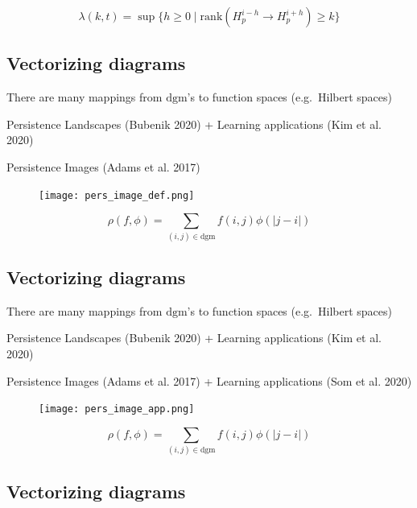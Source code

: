 \documentclass[
  letterpaper,
  DIV=11,
  numbers=noendperiod,
  oneside]{scrartcl}
\begin{document}
\[ \lambda(k, t) = \sup \{ h \geq 0 \mid \mathrm{rank}(H_p^{i-h} \to H_p^{i+h}) \geq k \} \]

\hypertarget{vectorizing-diagrams-2}{%
\subsection{Vectorizing diagrams}\label{vectorizing-diagrams-2}}

There are many mappings from \(\mathrm{dgm}\)'s to function spaces
(e.g.~Hilbert spaces)

Persistence Landscapes (Bubenik 2020) + Learning applications (Kim et
al. 2020)

Persistence Images (Adams et al. 2017)

\begin{figure}

{\centering \texttt{[image: pers\_image\_def.png]}

}

\end{figure}

\[ \rho(f, \phi) = \sum\limits_{(i,j) \in \mathrm{dgm}} f(i,j) \phi(\lvert j - i \rvert)\]

\hypertarget{vectorizing-diagrams-3}{%
\subsection{Vectorizing diagrams}\label{vectorizing-diagrams-3}}

There are many mappings from \(\mathrm{dgm}\)'s to function spaces
(e.g.~Hilbert spaces)

Persistence Landscapes (Bubenik 2020) + Learning applications (Kim et
al. 2020)

Persistence Images (Adams et al. 2017) + Learning applications (Som et
al. 2020)

\begin{figure}

{\centering \texttt{[image: pers\_image\_app.png]}

}

\end{figure}

\[ \rho(f, \phi) = \sum\limits_{(i,j) \in \mathrm{dgm}} f(i,j) \phi(\lvert j - i \rvert)\]

\hypertarget{vectorizing-diagrams-4}{%
\subsection{Vectorizing diagrams}\label{vectorizing-diagrams-4}}
\end{document}
